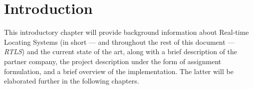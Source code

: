 \chapter{Introduction}

This introductory chapter will provide background information about Real-time Locating Systems (in short --- and throughout the rest of this document --- \emph{RTLS}) and the current state of the art, along with a brief description of the partner company, the project description under the form of assignment formulation, and a brief overview of the implementation.
The latter will be elaborated further in the following chapters.








